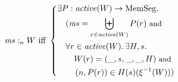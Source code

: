 \documentclass[compsoc,conference,letterpaper,fleqn]{IEEEtran}
\DeclareMathOperator{\dom}{dom}
\newcommand{\var}[1]{\mathit{#1}}
\newcommand{\hs}{\var{ms}}
\newcommand{\ms}{\hs}
\newcommand{\heap}{\var{mem}}
\newcommand{\plainfun}[2]{
  \ifthenelse{\equal{#2}{}}
  {\mathit{#1}}
  {\mathit{#1}(#2)}
}
\newcommand{\activeReg}[1]{\plainfun{active}{#1}}
\newcommand{\futurewk}{\mathbin{\sqsupseteq}^{\var{pub}}}
\newcommand{\futurestr}{\mathbin{\sqsupseteq}^{\var{priv}}}
\newcommand{\heapSat}[3][\heap]{#1 :_{#2} #3}
\newcommand{\memSat}[3][n]{\heapSat[#2]{#1}{#3}}
\newcommand{\plaindom}[1]{\mathrm{#1}}
\newcommand{\HeapSegments}{\plaindom{MemSeg}}
\newcommand{\npair}[2][n]{\left(#1,#2 \right)}
\begin{document}





\begin{align*}
  &\memSat{\ms}{W}
    \text{ iff }
    \left\{\begin{aligned}
        &\exists P : \activeReg{W} \rightarrow \HeapSegments \ldotp \\
        &\quad (\hs = \biguplus_{r\in\activeReg{W}}P(r) \text{\footnotesize{ and }} \\
        &\quad \forall r \in \activeReg{W} \ldotp \exists H,s \ldotp\\
        &\qquad W(r) = (\_,s,\_,\_,H) \text{\footnotesize{ and }} \\
        &\qquad \npair[n]{P(r)} \in H(s)(\xi^{-1}(W)))\\
      \end{aligned}\right.
\end{align*}
\end{document}
